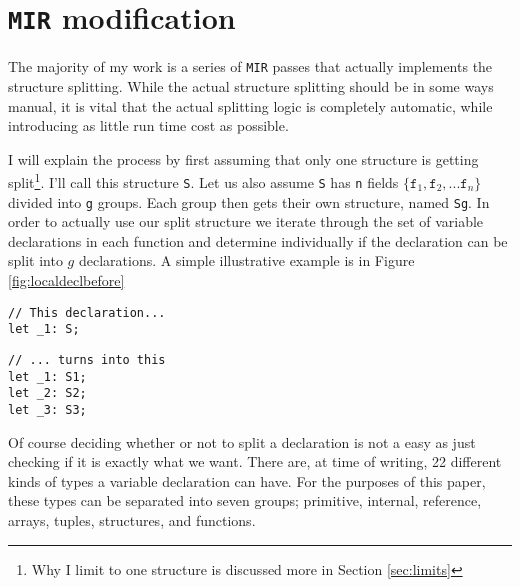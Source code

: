 \documentclass[12pt,oneside]{book}
\newcommand{\mirname}{{\texttt{MIR}}}
\def \mir {\mirname{}\xspace}
\newcommand{\teststructname}{{\texttt{S}}}
\def \S {\teststructname{}\xspace}
\begin{document}
\section{\mir modification}

The majority of my work is a series of \mir passes that actually
implements the structure splitting. While the actual structure splitting should
be in some ways manual, it is vital that the actual splitting logic is
completely automatic, while introducing as little run time cost as possible.

I will explain the process by first assuming that only one structure is getting
split\footnote{Why I limit to one structure is discussed more in Section
\ref{sec:limits}}. I'll call this structure \S. Let us also assume \S has \texttt{n}
fields $\{\texttt{f}_1, \texttt{f}_2, ... \texttt{f}_n\}$
divided into \texttt{g} groups.
Each group then gets their own structure, named \texttt{Sg}.
In order to actually use our split structure we iterate through the set
of variable declarations in each function and determine individually if the
declaration can be split into $g$ declarations. A simple illustrative example is
in Figure \ref{fig:localdeclbefore}

\begin{figure*}
  \begin{minipage}[t]{0.5\linewidth}
\begin{verbatim}
// This declaration...
let _1: S;
\end{verbatim}
  \end{minipage}
  \begin{minipage}[t]{0.5\linewidth}
\begin{verbatim}
// ... turns into this
let _1: S1;
let _2: S2;
let _3: S3;
\end{verbatim}
  \end{minipage}
  
  \caption{Simple Local Declarations Splitting $g = 3$}
  \label{fig:localdeclbefore}
\end{figure*}

Of course deciding whether or not to split a declaration is not a easy as just
checking if it is exactly what we want.  
There are, at time of writing, 22 different kinds of types a variable declaration
can have. For the purposes of this paper, these types can be separated into seven
groups; primitive, internal, reference, arrays, tuples, structures,
and functions.
\end{document}
